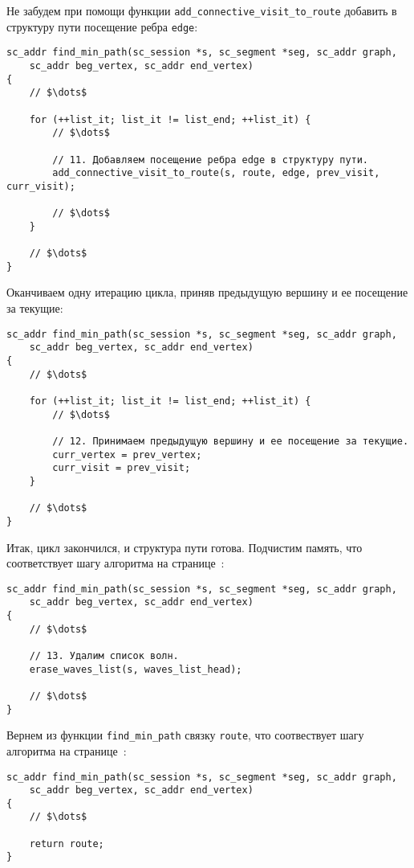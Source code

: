 Не забудем при помощи функции
\lstinline|add_connective_visit_to_route| добавить в структуру пути
посещение ребра \lstinline|edge|:

\begin{lstlisting}[texcl]
sc_addr find_min_path(sc_session *s, sc_segment *seg, sc_addr graph,
    sc_addr beg_vertex, sc_addr end_vertex)
{
    // $\dots$

    for (++list_it; list_it != list_end; ++list_it) {
        // $\dots$

        // 11. Добавляем посещение ребра edge в структуру пути.
        add_connective_visit_to_route(s, route, edge, prev_visit, curr_visit);

        // $\dots$
    }

    // $\dots$
}
\end{lstlisting}

Оканчиваем одну итерацию цикла, приняв предыдущую вершину и ее
посещение за текущие:

\begin{lstlisting}[texcl]
sc_addr find_min_path(sc_session *s, sc_segment *seg, sc_addr graph,
    sc_addr beg_vertex, sc_addr end_vertex)
{
    // $\dots$

    for (++list_it; list_it != list_end; ++list_it) {
        // $\dots$

        // 12. Принимаем предыдущую вершину и ее посещение за текущие.
        curr_vertex = prev_vertex;
        curr_visit = prev_visit;
    }

    // $\dots$
}
\end{lstlisting}

Итак, цикл закончился, и структура пути готова. Подчистим память, что
соответствует шагу алгоритма на
странице~\pageref{astep:S16_Erase_waves_list}:

\begin{lstlisting}[texcl]
sc_addr find_min_path(sc_session *s, sc_segment *seg, sc_addr graph,
    sc_addr beg_vertex, sc_addr end_vertex)
{
    // $\dots$

    // 13. Удалим список волн.
    erase_waves_list(s, waves_list_head);

    // $\dots$
}
\end{lstlisting}

Вернем из функции \lstinline|find_min_path| связку \lstinline|route|,
что соотвествует шагу алгоритма на
странице~\pageref{astep:S17_Result}:

\begin{lstlisting}[texcl]
sc_addr find_min_path(sc_session *s, sc_segment *seg, sc_addr graph,
    sc_addr beg_vertex, sc_addr end_vertex)
{
    // $\dots$

    return route;
}
\end{lstlisting}

